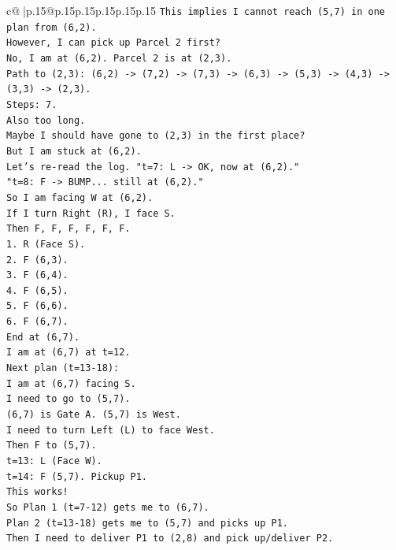 \documentclass{article}
\begin{document}
{\begin{supertabular}{c@{$\;$}|p{.15\linewidth}@{}p{.15\linewidth}p{.15\linewidth}p{.15\linewidth}p{.15\linewidth}p{.15\linewidth}}
{{{\texttt{This implies I cannot reach (5,7) in one plan from (6,2).} \\
\texttt{However, I can pick up Parcel 2 first?} \\
\texttt{No, I am at (6,2). Parcel 2 is at (2,3).} \\
\texttt{Path to (2,3): (6,2) {-}> (7,2) {-}> (7,3) {-}> (6,3) {-}> (5,3) {-}> (4,3) {-}> (3,3) {-}> (2,3).} \\
\texttt{Steps: 7.} \\
\texttt{Also too long.} \\
\texttt{Maybe I should have gone to (2,3) in the first place?} \\
\texttt{But I am stuck at (6,2).} \\
\texttt{Let's re{-}read the log. "t=7: L {-}> OK, now at (6,2)."} \\
\texttt{"t=8: F {-}> BUMP... still at (6,2)."} \\
\texttt{So I am facing W at (6,2).} \\
\texttt{If I turn Right (R), I face S.} \\
\texttt{Then F, F, F, F, F, F.} \\
\texttt{1. R (Face S).} \\
\texttt{2. F (6,3).} \\
\texttt{3. F (6,4).} \\
\texttt{4. F (6,5).} \\
\texttt{5. F (6,6).} \\
\texttt{6. F (6,7).} \\
\texttt{End at (6,7).} \\
\texttt{I am at (6,7) at t=12.} \\
\texttt{Next plan (t=13{-}18):} \\
\texttt{I am at (6,7) facing S.} \\
\texttt{I need to go to (5,7).} \\
\texttt{(6,7) is Gate A. (5,7) is West.} \\
\texttt{I need to turn Left (L) to face West.} \\
\texttt{Then F to (5,7).} \\
\texttt{t=13: L (Face W).} \\
\texttt{t=14: F (5,7). Pickup P1.} \\
\texttt{This works!} \\
\texttt{So Plan 1 (t=7{-}12) gets me to (6,7).} \\
\texttt{Plan 2 (t=13{-}18) gets me to (5,7) and picks up P1.} \\
\texttt{Then I need to deliver P1 to (2,8) and pick up/deliver P2.} \\
}}}
\end{supertabular}}
\end{document}
